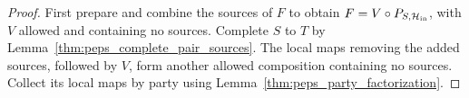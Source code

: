 \begin{proof}\leanok
    First prepare and combine the sources of $F$ to obtain
    $F=V\circ P_{S,\mathcal H_{\rm in}}$, with $V$ allowed and containing
    no sources. Complete $S$ to $T$ by
    Lemma~\ref{thm:peps_complete_pair_sources}. The local maps removing
    the added sources, followed by $V$, form another allowed composition
    containing no sources. Collect its local maps by party using
    Lemma~\ref{thm:peps_party_factorization}.
\end{proof}
